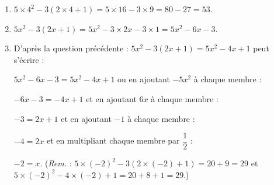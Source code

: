 
\medskip

\begin{enumerate}
\item %
$5 \times 4^2 - 3(2\times 4+1) = 5 \times 16 - 3\times 9 = 80 - 27 = 53$.
\item %
$5x^2 - 3(2x + 1) = 5x^2 - 3 \times 2x - 3 \times 1 = 5x^2 - 6x - 3$.
\item %
D'après la question précédente : $5x^2 - 3(2x+1)= 5x^2 - 4x +1$ peut s'écrire :

$5x^2 - 6x - 3 = 5x^2 - 4x +1$ ou en ajoutant $- 5x^2$ à chaque membre :

$- 6x - 3 = - 4x + 1$ et en ajoutant $6x$ à chaque membre :

$- 3 = 2x + 1$ et en ajoutant $- 1 $ à chaque membre :

$- 4 = 2x$ et en multipliant chaque membre par $\dfrac{1}{2}$ :

$- 2 =x$.
(\emph{Rem.} : $5\times (- 2)^2 - 3(2 \times (- 2) + 1) = 20 + 9 = 29 $ et 
$5\times (- 2)^2 - 4\times (- 2) +1 = 20 + 8 + 1 = 29$.)
\end{enumerate}



\vspace{0,5cm}

